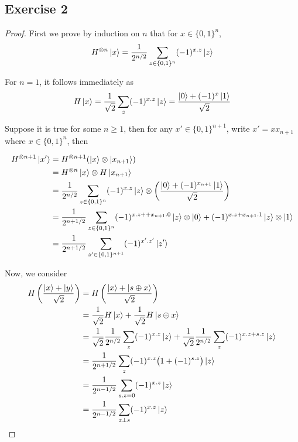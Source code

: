 \documentclass{article}
\begin{document}
\subsection*{Exercise 2}
\begin{proof}
First we prove by induction on $n$ that for $x \in \{0,1\}^n$, $$H^{\otimes n}\ket x = \frac{1}{2^{n/2}} \sum_{z \in \{0,1\}^n} (-1)^{x.z} \ket z $$

For $n=1$, it follows immediately as 
$$H\ket x = \frac{1}{\sqrt2} \sum_z (-1)^{x.z} \ket z = \frac{\ket0 + (-1)^x \ket1}{\sqrt2}$$

Suppose it is true for some $n \geq 1$, then for any $x' \in \{0,1\}^{n+1}$, write $x' = xx_{n+1}$ where $x \in \{0,1\}^n$, then

\begin{align*}
    H^{\otimes n+1}\ket{x'} &= H^{\otimes n+1}(\ket{x} \otimes \ket{x_{n+1}}) \\
    &= H^{\otimes n}\ket{x} \otimes H\ket{x_{n+1}} \\ 
    &= \frac{1}{2^{n/2}} \sum_{z \in \{0,1\}^n} (-1)^{x.z} \ket z \otimes \left(\frac{\ket0 + (-1)^{x_{n+1}}\ket1}{\sqrt2}\right) \\
    &= \frac{1}{2^{n+1/2}} \sum_{z \in \{0,1\}^n} (-1)^{x.z + + x_{n+1}.0} \ket z \otimes \ket0 + (-1)^{x.z + x_{n+1}.1} \ket z \otimes \ket1 \\
    &= \frac{1}{2^{n+1/2}} \sum_{z' \in \{0,1\}^{n+1}} (-1)^{x'.z'} \ket{z'}
\end{align*}

Now, we consider
\begin{align*}
    H\left(\frac{\ket x + \ket y}{\sqrt2}\right) &= H\left(\frac{\ket x + \ket{s \oplus x}}{\sqrt2}\right) \\
    &= \frac{1}{\sqrt2} H\ket{x} + \frac{1}{\sqrt2} H\ket{s \oplus x} \\
    &= \frac{1}{\sqrt2} \frac{1}{2^{n/2}} \sum_z (-1)^{x.z} \ket z +  \frac{1}{\sqrt2} \frac{1}{2^{n/2}} \sum_z (-1)^{x.z + s.z} \ket z \\
    &= \frac{1}{2^{n+1/2}} \sum_z (-1)^{x.z} \big(1 + (-1)^{s.z}\big) \ket z \\
    &= \frac{1}{2^{n-1/2}} \sum_{s.z = 0} (-1)^{x.z} \ket z \\
    &= \frac{1}{2^{n-1/2}} \sum_{z \perp s} (-1)^{x.z} \ket z
\end{align*}

\end{proof}
\end{document}
